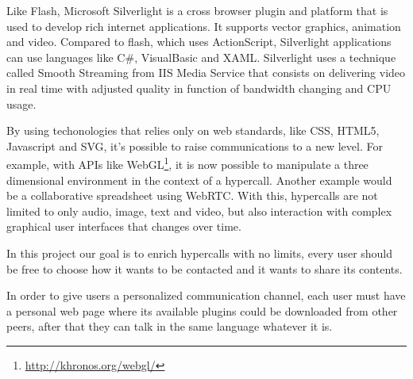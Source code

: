   Like Flash, Microsoft Silverlight is a cross browser plugin and platform that is used to develop rich internet applications. It supports vector graphics, animation and video. Compared to flash, which uses ActionScript, Silverlight applications can use languages like C\#, VisualBasic and \ac{XAML}. Silverlight uses a technique called Smooth Streaming from IIS Media Service that consists on delivering video in real time with adjusted quality in function of bandwidth changing and \ac{CPU} usage.



  By using techonologies that relies only on web standards, like \ac{CSS}, \ac{HTML}5, Javascript and \ac{SVG}, it's possible to raise communications to a new level. For example, with \ac{API}s like WebGL\footnote{\url{http://khronos.org/webgl/}}, it is now possible to manipulate a three dimensional environment in the context of a hypercall. Another example would be a collaborative spreadsheet using WebRTC. With this, hypercalls are not limited to only audio, image, text and video, but also interaction with complex graphical user interfaces that changes over time.

  In this project our goal is to enrich hypercalls with no limits, every user should be free to choose how it wants to be contacted and it wants to share its contents.

  In order to give users a personalized communication channel, each user must have a personal web page where its available plugins could be downloaded from other peers, after that they can talk in the same language whatever it is.

